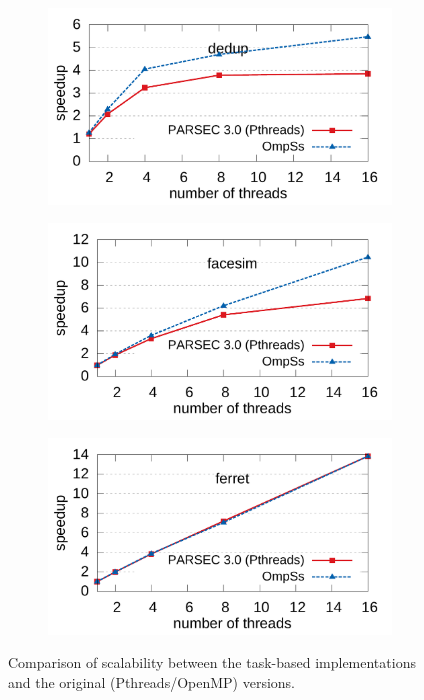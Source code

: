 \begin{figure}[p]
				\centering
        \begin{subfigure}[b]{0.8\textwidth}
                \includegraphics[width=\textwidth]{task_benchmarks/figures/dedup_scale}
                \label{fig:dedup_scale}
        \end{subfigure}
\hfill
        \begin{subfigure}[b]{0.8\textwidth}
                \includegraphics[width=\textwidth]{task_benchmarks/figures/facesim_scale}
                \label{fig:facesim_scale}
        \end{subfigure}
\hfill
				\begin{subfigure}[b]{0.8\textwidth}
                \includegraphics[width=\textwidth]{task_benchmarks/figures/ferret_scale}
                \label{fig:ferret_scale}
        \end{subfigure}%
      \caption{Comparison of scalability between the task-based implementations and the original (Pthreads/OpenMP) versions.}
			\label{fig:scalability_graphs_2}
\end{figure}

